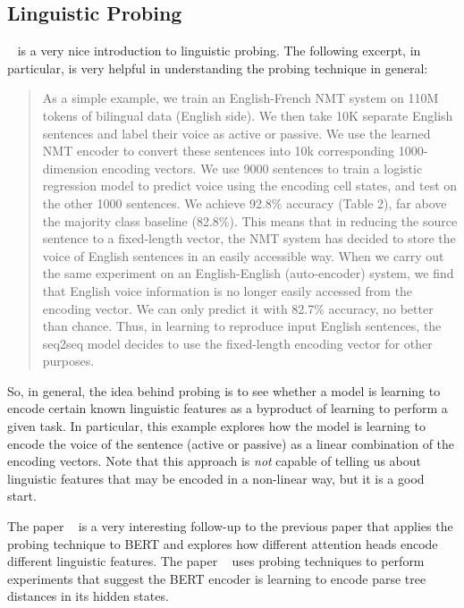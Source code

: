\documentclass{article}
\begin{document}
\subsection*{Linguistic Probing}
~\cite{probing:neural} is a very nice introduction to linguistic probing.
The following excerpt, in particular, is very helpful in understanding the probing technique in general:
\begin{quote}
    As a simple example, we train an English-French NMT system on 110M tokens of bilingual data (English side). We then take 10K separate English sentences and label their voice as active or passive. We use the learned NMT encoder to convert these sentences into 10k corresponding 1000-dimension encoding vectors. We use 9000 sentences to train a logistic regression model to predict voice using the encoding cell states, and test on the other 1000 sentences. We achieve 92.8\% accuracy (Table 2), far above the majority class baseline (82.8\%). This means that in reducing the source sentence to a fixed-length vector, the NMT system has decided to store the voice of English sentences in an easily accessible way. When we carry out the same experiment on an English-English (auto-encoder) system, we find that English voice information is no longer easily accessed from the encoding vector. We can only predict it with 82.7\% accuracy, no better than chance. Thus, in learning to reproduce input English sentences, the seq2seq model decides to use the fixed-length encoding vector for other purposes.
\end{quote}

So, in general, the idea behind probing is to see whether a model is learning to encode certain known linguistic features as a byproduct of learning to perform a given task.
In particular, this example explores how the model is learning to encode the voice of the sentence (active or passive) as a linear combination of the encoding vectors.
Note that this approach is \textit{not} capable of telling us about linguistic features that may be encoded in a non-linear way, but it is a good start.

The paper \citeauthor{probing:bert}~\cite{probing:bert} is a very interesting follow-up to the previous paper that applies the probing technique to BERT and explores how different attention heads encode different linguistic features.
The paper \citeauthor{probing:parse-trees}~\cite{probing:parse-trees} uses probing techniques to perform experiments that suggest the BERT encoder is learning to encode parse tree distances in its hidden states.
\end{document}
